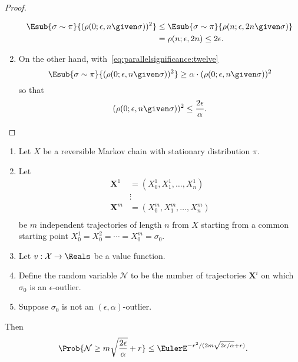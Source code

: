 \documentclass[12pt]{article}
\begin{document}
\begin{proof}
\begin{enumerate}
\begin{align*}
                \Esub{\sigma \sim \pi}{(\rho(0; \epsilon, n \given
                \sigma))^2}     & \le \Esub{\sigma \sim \pi}{\rho(n;
                \epsilon, 2n \given \sigma) } \\
                &= \rho(n; \epsilon, 2n) \le 2\epsilon.
            \end{align*}
        \item
            On the other hand, with~\eqref{eq:parallelsignificance:twelve}
            \[
                \Esub{\sigma \sim \pi}{(\rho(0; \epsilon, n \given
                \sigma))^2 } \ge \alpha \cdot (\rho(0; \epsilon, n
                \given \sigma))^2
            \] so that
            \[
                (\rho(0; \epsilon, n \given \sigma))^2 \le \frac{2\epsilon}
                {\alpha}.
            \]
    \end{enumerate}
\end{proof}

\begin{theorem}
    \label{thm:parallelsignificance:thm3point1}
    \begin{enumerate}
        \item
            Let \( X \) be a reversible Markov chain with stationary
            distribution \( \pi \).
        \item
            Let
            \begin{align*}
                \mathbf{X}^1    &= (X_0^1, X_1^1, \dots, X_n^1 )\\
                &\vdots \\
                \mathbf{X}^m    &= (X_0^m, X_1^m, \dots, X_n^m )\\
            \end{align*}
            be \( m \) independent trajectories of length \( n \) from \(
            X \) starting from a common starting point \( X_0^1 = X_0^2
            = \cdots = X_0^m = \sigma_0 \).
        \item
            Let \( v :  \mathcal{X} \to \Reals \) be a value function.
        \item
            Define the random variable \( \mathcal{N} \) to be the
            number of trajectories \( \mathbf{X}^i \) on which \( \sigma_0
            \) is an \( \epsilon \)-outlier.
        \item
            Suppose \( \sigma_0 \) is not an \( (\epsilon, \alpha) \)-outlier.
    \end{enumerate}
    Then
    \[
        \Prob{\mathcal{N} \ge m \sqrt{\frac{2\epsilon}{\alpha}} + r }
        \le \EulerE^{ -r^{2}/ (2 m\sqrt{2\epsilon/\alpha} + r)}.
    \]
\end{theorem}
\end{document}
